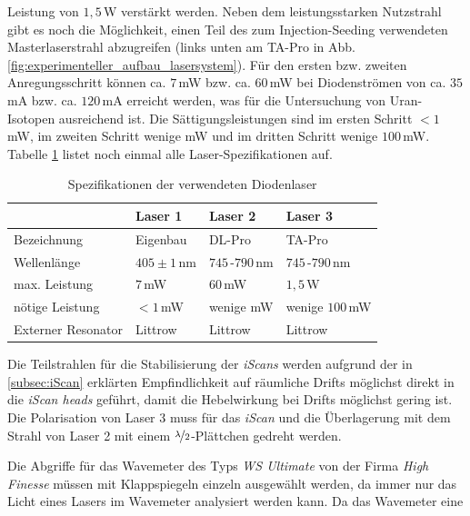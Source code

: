 Leistung von $1,5\,$W verstärkt werden. Neben dem leistungsstarken Nutzstrahl
gibt es noch die Möglichkeit, einen Teil des zum Injection-Seeding verwendeten
Masterlaserstrahl abzugreifen (links unten am TA-Pro in Abb.
\ref{fig:experimenteller_aufbau_lasersystem}). Für den ersten bzw.
zweiten Anregungsschritt können ca. $7\,$mW bzw. ca. $60\,$mW bei Diodenströmen von ca. $35\,$mA bzw. ca.
$120\,$mA erreicht werden, was für die Untersuchung von Uran-Isotopen
ausreichend ist. Die Sättigungsleistungen sind im ersten Schritt $<1\,$mW, im
zweiten Schritt wenige mW und im dritten Schritt wenige $100\,$mW. Tabelle \ref{tab:laser_spezifikationen} listet noch einmal alle
Laser-Spezifikationen auf.
\par
\begin{table}
	\begin{tabular}{p{}|p{}p{}p{}}
		\toprule
		& Laser 1 & Laser 2 & Laser 3\\
		\midrule[1px]
		\hline
		Bezeichnung & Eigenbau & DL-Pro & TA-Pro\\
		Wellenlänge & $405\pm1\,$nm & $745\,$-$790\,$nm & $745\,$-$790\,$nm\\
		max. Leistung & $7\,$mW & $60\,$mW & $1,5\,$W\\
		nötige Leistung & $<1\,$mW & wenige mW & wenige $100\,$mW\\
		Externer Resonator & Littrow & Littrow & Littrow\\
		\bottomrule[1px]
	\end{tabular}
	\caption[Spezifikationen der verwendeten Diodenlaser]{Spezifikationen der
	verwendeten Diodenlaser}
	\label{tab:laser_spezifikationen}
\end{table}
Die Teilstrahlen für die Stabilisierung der \textit{iScans} werden aufgrund der
in \ref{subsec:iScan} erklärten Empfindlichkeit auf räumliche Drifts möglichst
direkt in die \textit{iScan heads} geführt, damit die Hebelwirkung bei Drifts
möglichst gering ist. Die Polarisation von Laser 3 muss für das \textit{iScan}
und die Überlagerung mit dem Strahl von Laser 2 mit einem
$\nicefrac{\lambda}{2}$-Plättchen gedreht werden.\par
Die Abgriffe für das Wavemeter des Typs \textit{WS Ultimate} von der Firma \textit{High Finesse}
müssen mit Klappspiegeln einzeln ausgewählt werden, da immer nur das Licht eines Lasers im Wavemeter analysiert werden kann. Da das Wavemeter eine
